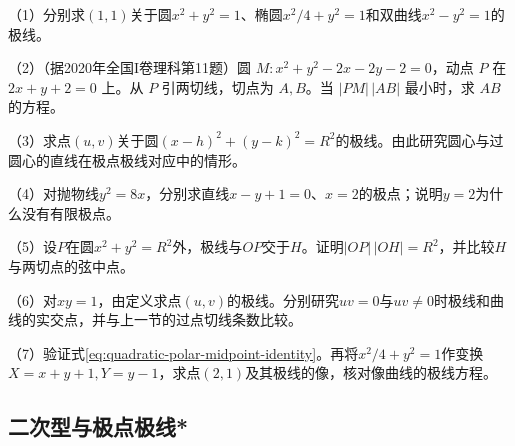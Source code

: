 \begin{exercise}
\mbox{}\par\nobreak
\begin{samepage}
（1）分别求\((1,1)\)关于圆\(x^2+y^2=1\)、椭圆\(x^2/4+y^2=1\)和双曲线\(x^2-y^2=1\)的极线。
\par
\end{samepage}

\begin{samepage}
（2）（据2020年全国I卷理科第11题）圆 \(M:x^2+y^2-2x-2y-2=0\)，动点 \(P\) 在 \(2x+y+2=0\) 上。从 \(P\) 引两切线，切点为 \(A,B\)。当 \(|PM|\,|AB|\) 最小时，求 \(AB\) 的方程。
\par
\end{samepage}

\begin{samepage}
（3）求点\((u,v)\)关于圆\((x-h)^2+(y-k)^2=R^2\)的极线。由此研究圆心与过圆心的直线在极点极线对应中的情形。
\par
\end{samepage}

\begin{samepage}
（4）对抛物线\(y^2=8x\)，分别求直线\(x-y+1=0\)、\(x=2\)的极点；说明\(y=2\)为什么没有有限极点。
\par
\end{samepage}

\begin{samepage}
（5）设\(P\)在圆\(x^2+y^2=R^2\)外，极线与\(OP\)交于\(H\)。证明\(|OP|\,|OH|=R^2\)，并比较\(H\)与两切点的弦中点。
\par
\end{samepage}

\begin{samepage}
（6）对\(xy=1\)，由定义求点\((u,v)\)的极线。分别研究\(uv=0\)与\(uv\ne0\)时极线和曲线的实交点，并与上一节的过点切线条数比较。
\par
\end{samepage}

\begin{samepage}
（7）验证式\eqref{eq:quadratic-polar-midpoint-identity}。再将\(x^2/4+y^2=1\)作变换\(X=x+y+1,Y=y-1\)，求点\((2,1)\)及其极线的像，核对像曲线的极线方程。
\par
\end{samepage}


\end{exercise}

\newpage
\subsection{二次型与极点极线*}
\label{subsec:quadratic-quadratic-forms-and-polarity}

